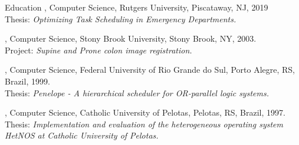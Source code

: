 \documentclass[10pt]{resume}
\author{\quad{}\quad{}\quad{}Ana Paula Centeno}
\begin{document}
\maketitle{}


\begin{category}{Education}
  , Computer Science, Rutgers University, Piscataway, NJ, 2019\\
  Thesis: \emph{Optimizing Task Scheduling in Emergency Departments.}

  , Computer Science, Stony Brook University, Stony Brook,
  NY, 2003.\\
  Project: \emph{Supine and Prone colon image registration.}

  , Computer Science, Federal University of
  Rio Grande do Sul, Porto Alegre, RS, Brazil, 1999. \\
  Thesis: \emph{Penelope - A hierarchical scheduler for OR-parallel logic
    systems.} 
  
  , Computer Science, Catholic University of Pelotas,
  Pelotas, RS, Brazil, 1997.  \\
  Thesis: \emph{Implementation and evaluation of the heterogeneous
    operating system HetNOS at Catholic University of Pelotas.}

\end{category}
\end{document}
